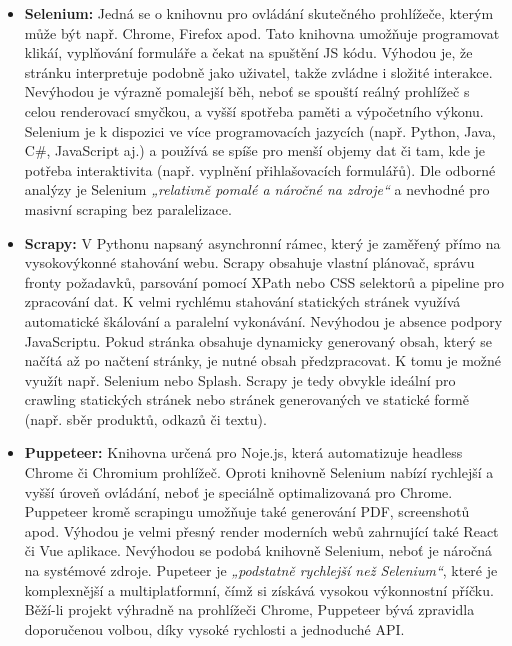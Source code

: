 \begin{itemize}
    \item \textbf{Selenium:} Jedná se o knihovnu pro ovládání skutečného
        prohlížeče, kterým může být např. Chrome, Firefox apod. Tato knihovna
        umožňuje programovat klikáí, vyplňování formuláře a čekat na spuštění
        JS kódu. Výhodou je, že stránku interpretuje podobně jako uživatel,
        takže zvládne i složité interakce. Nevýhodou je výrazně pomalejší
        běh, neboť se spouští reálný prohlížeč s celou renderovací smyčkou,
        a vyšší spotřeba paměti a výpočetního výkonu. Selenium je k dispozici
        ve více programovacích jazycích (např. Python, Java, C\#, JavaScript
        aj.) a používá se spíše pro menší objemy dat či tam, kde je potřeba
        interaktivita (např. vyplnění přihlašovacích formulářů). Dle odborné
        analýzy je Selenium \emph{„relativně pomalé a náročné na zdroje“}
        a nevhodné pro masivní scraping bez paralelizace.
        \cite{YHVfLHsNlUItkF6G,XDjScR8U0lQdUngn} %
    \item \textbf{Scrapy:} V Pythonu napsaný asynchronní rámec, který
        je zaměřený přímo na vysokovýkonné stahování webu. Scrapy obsahuje
        vlastní plánovač, správu fronty požadavků, parsování pomocí XPath
        nebo CSS selektorů a pipeline pro zpracování dat. K velmi rychlému
        stahování statických stránek využívá automatické škálování
        a paralelní vykonávání. Nevýhodou je absence podpory JavaScriptu.
        Pokud stránka obsahuje dynamicky generovaný obsah, který se načítá až
        po načtení stránky, je nutné obsah předzpracovat. K tomu je možné
        využít např. Selenium nebo Splash. Scrapy je tedy obvykle ideální
        pro crawling statických stránek nebo stránek generovaných ve statické
        formě (např. sběr produktů, odkazů či textu).
        \cite{YHVfLHsNlUItkF6G,XDjScR8U0lQdUngn} %
    \item \textbf{Puppeteer:} Knihovna určená pro Noje.js, která automatizuje
        headless Chrome či Chromium prohlížeč. Oproti knihovně Selenium
        nabízí rychlejší a vyšší úroveň ovládání, neboť je speciálně
        optimalizovaná pro Chrome. Puppeteer kromě scrapingu umožňuje také
        generování PDF, screenshotů apod. Výhodou je velmi přesný render
        moderních webů zahrnující také React či Vue aplikace. Nevýhodou
        se podobá knihovně Selenium, neboť je náročná na systémové zdroje.
        Pupeteer je \emph{„podstatně rychlejší než Selenium“}, které
        je komplexnější a multiplatformní, čímž si získává vysokou
        výkonnostní příčku. Běží-li projekt výhradně na prohlížeči Chrome,
        Puppeteer bývá zpravidla doporučenou volbou, díky vysoké rychlosti
        a jednoduché API. \cite{YHVfLHsNlUItkF6G,KVcwMBKpAmczm8Mo}
\end{itemize}

